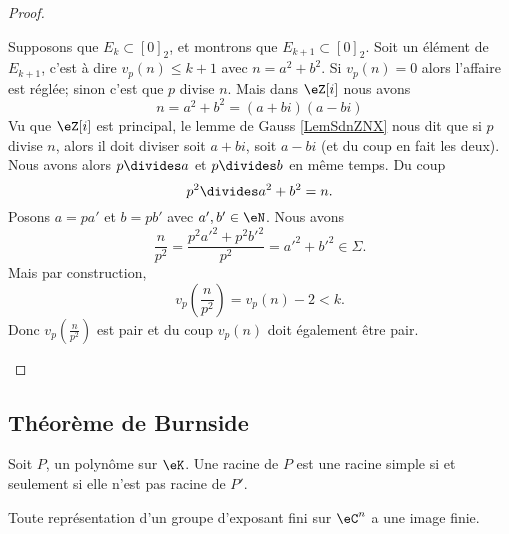 \begin{proof}
\begin{subproof}
        Supposons que \( E_k\subset[0]_2\), et montrons que \( E_{k+1}\subset[0]_2\). Soit un élément de \( E_{k+1}\), c'est à dire \( v_p(n)\leq k+1\) avec \( n=a^2+b^2\). Si \( v_p(n)=0\) alors l'affaire est réglée; sinon c'est que \( p\) divise \( n\). Mais dans \( \eZ[i]\) nous avons
        \begin{equation}
            n=a^2+b^2=(a+bi)(a-bi)
        \end{equation}
        Vu que \( \eZ[i]\) est principal, le lemme de Gauss \ref{LemSdnZNX} nous dit que si \( p\) divise \( n\), alors il doit diviser soit \( a+bi\), soit \( a-bi\) (et du coup en fait les deux). Nous avons alors \( p\divides a\) et \( p\divides b\) en même temps. Du coup
        \begin{equation}
            p^2\divides a^2+b^2=n.
        \end{equation}
        Posons \( a=pa'\) et \( b=pb'\) avec \( a',b'\in \eN\). Nous avons
        \begin{equation}
            \frac{ n }{ p^2 }=\frac{ p^2a'^2+p^2b'^2 }{ p^2 }=a'^2+b'^2\in \Sigma.
        \end{equation}
        Mais par construction,
        \begin{equation}
            v_p\left( \frac{ n }{ p^2 } \right)=v_p(n)-2<k.
        \end{equation}
        Donc \( v_p(\frac{ n }{ p^2 })\) est pair et du coup \( v_p(n)\) doit également être pair.

    \end{subproof}
\end{proof}

\subsection{Théorème de Burnside}

\begin{lemma}       \label{LemwXXzIt}
    Soit \( P\), un polynôme sur \( \eK\). Une racine de \( P\) est une racine simple si et seulement si elle n'est pas racine de \( P'\).
\end{lemma}

\begin{theorem}     \label{ThoBurnsideoPuCtS}
    Toute représentation d'un groupe d'exposant fini sur \( \eC^n\) a une image finie.
\end{theorem}


